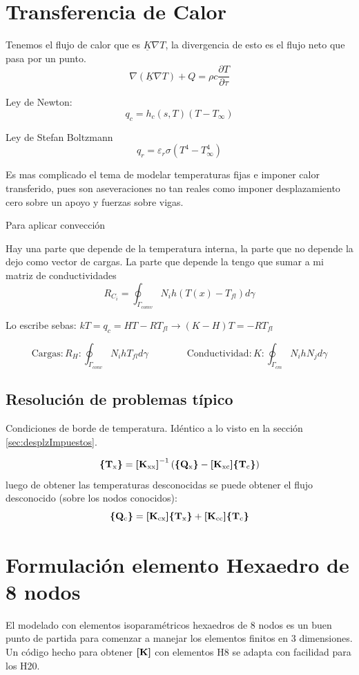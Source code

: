 \section{Transferencia de Calor}

Tenemos el flujo de calor que es $\underline{K} \nabla T$, la divergencia de esto es el flujo neto que pasa por un punto.
\[
\nabla(\underline{K} \nabla T)+Q=\rho c \frac{\partial T}{\partial \tau}
\] 

Ley de Newton: 
\[
q_{c}=h_{c}(s, T)\left(T-T_{\infty}\right)
\]

Ley de Stefan Boltzmann
\[
q_{r}=\varepsilon_{r} \sigma\left(T^{4}-T_{\infty}^{4}\right)
\]

Es mas complicado el tema de modelar temperaturas fijas e imponer calor transferido, pues son aseveraciones no tan reales como imponer desplazamiento cero sobre un apoyo y  fuerzas sobre vigas.

Para aplicar convección 

Hay una parte que depende de la temperatura interna, la parte que no depende la dejo como vector de cargas. La parte que depende la tengo que sumar a mi matriz de conductividades
\[
R_{C_{i}}=\oint_{\Gamma_{c o m v}} N_{i} h\left(T(x)-T_{f l}\right) d \gamma
\]

Lo escribe sebas: $kT=q_c = HT-RT_{fl} \longrightarrow (K-H)T = -R T_{fl}$

\[
\mathrm{Cargas:} R_{H} : \oint_{\Gamma_{c o n v}} N_{i} h T_{f l} d \gamma \qquad \qquad \mathrm{Conductividad:}  K : \oint_{\Gamma_{c m}} N_{i} h N_{j} d \gamma
\]


\subsection*{Resolución de problemas típico}

Condiciones de borde de temperatura. Idéntico a lo visto en la sección \ref{sec:desplzImpuestos}.

\[
\boldsymbol{\{ }\mathbf{T_{\mathrm{x}}} \boldsymbol{\}} = \boldsymbol{[}\mathbf{K_{\mathrm{xx}}} \boldsymbol{]}^{-1} \left( \boldsymbol{\{ }\mathbf{Q_\mathrm{x}} \boldsymbol{\}}- \boldsymbol{[}\mathbf{K_{\mathrm{xc}}} \boldsymbol{]}  \boldsymbol{\{ }\mathbf{T_\mathrm{c}} \boldsymbol{\}} \right)
\]
luego de obtener las temperaturas desconocidas se puede obtener el flujo desconocido (sobre los nodos conocidos):
\[
\boldsymbol{\{ }\mathbf{Q_{\mathrm{c}}} \boldsymbol{\}} = \boldsymbol{[}\mathbf{K_{\mathrm{cx}}} \boldsymbol{]} \boldsymbol{\{ }\mathbf{T_\mathrm{x}} \boldsymbol{\}} + \boldsymbol{[}\mathbf{K_{\mathrm{cc}}} \boldsymbol{]} \boldsymbol{\{ }\mathbf{T_\mathrm{c}} \boldsymbol{\}}  
\]





\section{Formulación elemento Hexaedro de 8 nodos}
\newcommand{\dof}{\ensuremath{\mathrm{dof}}}
El modelado con elementos isoparamétricos hexaedros de 8 nodos es un buen punto de partida para comenzar a manejar los elementos finitos en 3 dimensiones. Un código hecho para obtener $\boldsymbol{[}\mathbf{K} \boldsymbol{]}$ con elementos H8 se adapta con facilidad para los H20.

